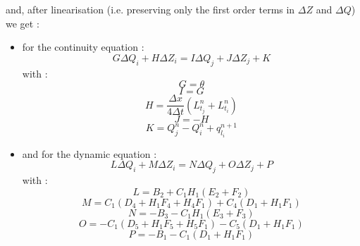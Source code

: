 \begin{itemize}
\vspace{0.5cm}

and, after linearisation (i.e. preserving only the first order terms in $\Delta Z$ and $\Delta Q$) we get :

\begin{itemize}
 \item for the continuity equation :
  \begin{equation}
   \label{CONT}
   \boxed{
     G \Delta Q_i + H \Delta Z_i = I \Delta Q_j + J \Delta Z_j + K
   }
  \end{equation}
  with :
  \begin{equation}
   \label{CONT1}
   G = \theta
  \end{equation}
  \begin{equation}
    \label{CONT2}
   I = G
  \end{equation}
  \begin{equation}
    \label{CONT3}
   H = \frac{\Delta x}{4 \Delta t} ( L_{t_j}^n + L_{t_i}^n )
  \end{equation}
  \begin{equation}
    \label{CONT4}
   J = -H
  \end{equation}
   \begin{equation}
   \label{CONT5}
   K = Q_{j}^n - Q_{i}^n + q_{l_i}^{n+1}
  \end{equation}

 \item and for the dynamic equation :
  \begin{equation}
   \label{DYN}
   \boxed{
     L \Delta Q_i + M \Delta Z_i = N \Delta Q_j + O \Delta Z_j + P
   }
  \end{equation}
  with :
  \begin{equation}
    \label{DYN1}
   L = B_2 + C_1 H_1 ( E_2 + F_2 )
  \end{equation}
  \begin{equation}
    \label{DYN2}
   M = C_1 ( D_4 + H_1 F_4 + H_4 F_1 ) + C_4 ( D_1 + H_1 F_1 )
  \end{equation}
   \begin{equation}
    \label{DYN3}
   N = -B_3 - C_1 H_1 ( E_3 + F_3 )
  \end{equation}
  \begin{equation}
     \label{DYN4}
   O = -C_1 ( D_5 + H_1 F_5 + H_5 F_1 ) - C_5 ( D_1 + H_1 F_1 )
  \end{equation}
  \begin{equation}
   \label{DYN5}
   P = -B_1 - C_1 ( D_1 + H_1 F_1 )
  \end{equation}
\end{itemize}


\end{itemize}
